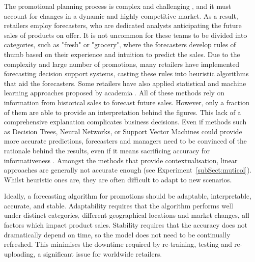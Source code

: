 \documentclass{ieeeaccess}
\begin{document}
The promotional planning process is complex and challenging \cite{ma2017retail}, and it must account for changes in a dynamic and highly competitive market. As a result, retailers employ forecasters, who are dedicated analysts anticipating the future sales of products on offer. It is not uncommon for these teams to be divided into categories, such as "fresh" or "grocery", where the forecasters develop rules of thumb based on their experience and intuition to predict the sales. Due to the complexity and large number of promotions, many retailers have implemented forecasting decision support systems, casting these rules into heuristic algorithms that aid the forecasters. Some retailers have also applied statistical and machine learning approaches proposed by academia \cite{van2016analysis,di2016application,ramanathan2011identifying,ali2009sku}.
All of these methods rely on information from historical sales to forecast future sales. However, only a fraction of them are able to provide an interpretation behind the figures. This lack of a comprehensive explanation complicates business decisions. Even if methods such as Decision Trees, Neural Networks, or Support Vector Machines could provide more accurate predictions, forecasters and managers need to be convinced of the rationale behind the results, even if it means sacrificing accuracy for informativeness \cite{louis2013analysts}. %
Amongst the methods that provide contextualisation, linear approaches are generally not accurate enough (see Experiment~\ref{subSect:muticol}). Whilst heuristic ones are, they are often difficult to adapt to new scenarios.

Ideally, a forecasting algorithm for promotions should be adaptable, interpretable, accurate, and stable. Adaptability requires that the algorithm performs well under distinct categories, different geographical locations and market changes, all factors which impact product sales. Stability requires that the accuracy does not dramatically depend on time, so the model does not need to be continually refreshed. This minimises the downtime required by re-training, testing and re-uploading, a significant issue for worldwide retailers.
\end{document}
